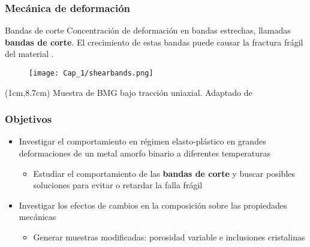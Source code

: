 \begin{frame}
 \frametitle{Mec\'anica de deformaci\'on}
 \begin{block}{Bandas de corte}
 Concentraci\'on de deformaci\'on en bandas estrechas, llamadas \textbf{bandas de corte}.
 El crecimiento de estas bandas puede causar la fractura fr\'agil del material \cite{schuh07}.
 \end{block}
 \begin{figure}
 \centering
 \texttt{[image: Cap\_1/shearbands.png]}
\end{figure}
\begin{textblock*}{\textwidth}(1cm,8.7cm)
 \centering
 \scriptsize{Muestra de BMG bajo tracci\'on uniaxial. Adaptado de \cite{albe13}}
\end{textblock*}

\end{frame}

\begin{frame}
 \frametitle{Objetivos}
 \vspace{0.5cm}
\begin{itemize}
 \item Investigar el comportamiento en r\'egimen elasto-pl\'astico en grandes deformaciones de un metal amorfo binario a diferentes temperaturas
 \begin{itemize}
  \item Estudiar el comportamiento de las \textbf{bandas de corte} y buscar posibles soluciones para evitar o retardar la falla fr\'agil
 \end{itemize}
 \item Investigar los efectos de cambios en la composici\'on sobre las propiedades mec\'anicas
 \begin{itemize}
  \item Generar muestras modificadas: porosidad variable e inclusiones cristalinas
 \end{itemize}
\end{itemize}
\end{frame}

